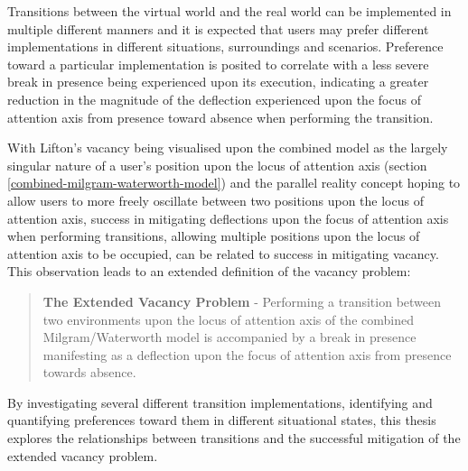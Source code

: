 Transitions between the virtual world and the real world can be implemented in multiple different manners and it is expected that users may prefer different implementations in different situations, surroundings and scenarios. Preference toward a particular implementation is posited to correlate with a less severe break in presence being experienced upon its execution, indicating a greater reduction in the magnitude of the deflection experienced upon the focus of attention axis from presence toward absence when performing the transition.

With Lifton's vacancy being visualised upon the combined model as the largely singular nature of a user's position upon the locus of attention axis (section \ref{combined-milgram-waterworth-model}) and the parallel reality concept hoping to allow users to more freely oscillate between two positions upon the locus of attention axis, success in mitigating deflections upon the focus of attention axis when performing transitions, allowing multiple positions upon the locus of attention axis to be occupied, can be related to success in mitigating vacancy. This observation leads to an extended definition of the vacancy problem:

\begin{quote}
	\textbf{The Extended Vacancy Problem} - Performing a transition between two environments upon the locus of attention axis of the combined Milgram/Waterworth model is accompanied by a break in presence manifesting as a deflection upon the focus of attention axis from presence towards absence.
\end{quote}

By investigating several different transition implementations, identifying and quantifying preferences toward them in different situational states, this thesis explores the relationships between transitions and the successful mitigation of the extended vacancy problem.








